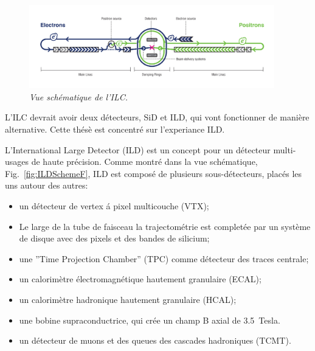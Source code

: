 \begin{figure}
	{\centering
		\includegraphics[width=0.95\textwidth]{graphics/ILC_scheme.jpg}
		\caption{\sl Vue sch\'ematique de l'ILC.}
		\label{fig:ILCSchemeF}
	}
\end{figure}

L’ILC devrait avoir deux d\'etecteurs, SiD et ILD, qui vont fonctionner de mani\`ere alternative.%
Cette th\'es\`e est concentr\'e sur l'experiance ILD. 

L'International Large Detector (ILD) est un concept pour un détecteur multi-usages de haute précision. %
Comme montr\'e dans la vue schématique, Fig.~\ref {fig:ILDSchemeF}, ILD est compos\'e de plusieurs sous-d\'etecteurs, plac\'es les uns autour des autres:
\begin{itemize}
	\item un d\'etecteur de vertex \'a pixel multicouche (VTX);
	\item Le large de la tube de faisceau la trajectométrie est completée par un système de disque avec des pixels et des bandes de silicium;
	\item une ”Time Projection Chamber” (TPC) comme d\'etecteur des traces centrale;
	\item un calorim\`etre \'electromagn\'etique hautement granulaire (ECAL);
	\item un calorim\`etre hadronique hautement granulaire (HCAL);
	\item une bobine supraconductrice, qui cr\'ee un champ B axial de 3.5~Tesla.
	\item un d\'etecteur de muons et des queues des cascades hadroniques (TCMT).
\end{itemize}

